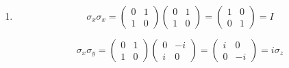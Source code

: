 \begin{enumerate}
    \begin{align*}
        S_zS_x
        -S_xS_z
    =&
    \frac{\hbar^2}{4}
    \begin{pmatrix}
    1 & 0 \\
    0 & -1
    \end{pmatrix}
    \begin{pmatrix}
    0 & 1 \\
    1 & 0
    \end{pmatrix}
    -
    \frac{\hbar^2}{4}
    \begin{pmatrix}
    0 & 1 \\
    1 & 0
    \end{pmatrix}
    \begin{pmatrix}
    1 & 0 \\
    0 & -1
    \end{pmatrix}\\
    =&
    \frac{\hbar^2}{4}
    \begin{pmatrix}
        0 & 1\\
        -1 & 0
    \end{pmatrix}
    -
    \frac{\hbar^2}{4}
    \begin{pmatrix}
        0 & -1\\
        1 & 0
    \end{pmatrix}
    \\
    =&
    \frac{\hbar^2}{4}
    \begin{pmatrix}
        0 & 2\\
        -2 & 0
    \end{pmatrix}\\
    =&i\hbar S_y
    \end{align*}
    \item 
    $$
    \sigma_x\sigma_x = 
    \begin{pmatrix}
        0 & 1\\
        1 & 0
    \end{pmatrix}
    \begin{pmatrix}
        0 & 1\\
        1 & 0
    \end{pmatrix}
    =\begin{pmatrix}
        1 & 0\\
        0 & 1
    \end{pmatrix}
    =I
    $$
    
    $$
    \sigma_x\sigma_y = 
    \begin{pmatrix}
        0 & 1\\
        1 & 0
    \end{pmatrix}
    \begin{pmatrix}
        0 & -i\\
        i & 0
    \end{pmatrix}
    =\begin{pmatrix}
        i & 0\\
        0 & -i
    \end{pmatrix}
    =i\sigma_z
    $$


\end{enumerate}
